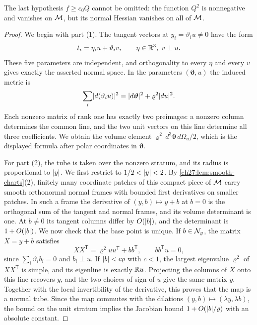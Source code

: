 The last hypothesis $f\ge c_0Q$ cannot be omitted: the function $Q^2$ is nonnegative and vanishes on $\mathcal M$, but its normal Hessian vanishes on all of $\mathcal M$.

\begin{proof}
We begin with part (1). The tangent vectors at $y_i=\vartheta_iu\ne0$ have the form
\[
 t_i=\eta_iu+\vartheta_iv,\qquad\eta\in\R^3,\ v\perp u.
\]
These five parameters are independent, and orthogonality to every $\eta$ and every $v$ gives exactly the asserted normal space. In the parameters $(\bm\vartheta,u)$ the induced metric is
\[
 \sum_i\lvert d(\vartheta_iu)\rvert^2=\lvert d\bm\vartheta\rvert^2+\varrho^2\lvert du\rvert^2.
\]
Each nonzero matrix of rank one has exactly two preimages: a nonzero column determines the common line, and the two unit vectors on this line determine all three coefficients. We obtain the volume element $\varrho^2\,d^3\bm\vartheta\,d\Omega_u/2$, which is the displayed formula after polar coordinates in $\bm\vartheta$.

For part (2), the tube is taken over the nonzero stratum, and its radius is proportional to $\lvert y\rvert$. We first restrict to $1/2<\lvert y\rvert<2$. By \cref{ch27:lem:smooth-charts}(2), finitely many coordinate patches of this compact piece of $\mathcal M$ carry smooth orthonormal normal frames with bounded first derivatives on smaller patches. In such a frame the derivative of $(y,b)\mapsto y+b$ at $b=0$ is the orthogonal sum of the tangent and normal frames, and its volume determinant is one. At $b\ne0$ its tangent columns differ by $O(\lvert b\rvert)$, and the determinant is $1+O(\lvert b\rvert)$. We now check that the base point is unique. If $b\in\mathcal N_{y}$, the matrix $X=y+b$ satisfies
\[
 XX^{\mathsf T}=\varrho^2uu^{\mathsf T}+bb^{\mathsf T},\qquad bb^{\mathsf T}u=0,
\]
since $\sum_i\vartheta_ib_i=0$ and $b_i\perp u$. If $\lvert b\rvert<c\varrho$ with $c<1$, the largest eigenvalue $\varrho^2$ of $XX^{\mathsf T}$ is simple, and its eigenline is exactly $\mathbb R u$. Projecting the columns of $X$ onto this line recovers $y$, and the two choices of sign of $u$ give the same matrix $y$. Together with the local invertibility of the derivative, this proves that the map is a normal tube. Since the map commutes with the dilations $(y,b)\mapsto(\lambda y,\lambda b)$, the bound on the unit stratum implies the Jacobian bound $1+O(\lvert b\rvert/\varrho)$ with an absolute constant.


\end{proof}
